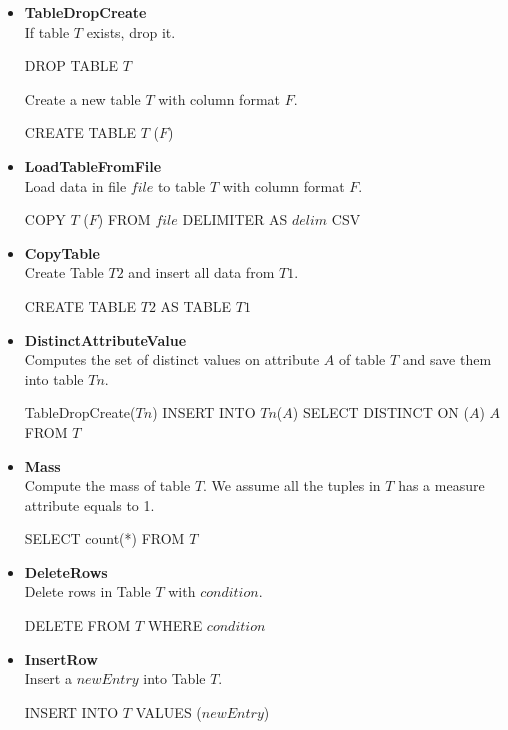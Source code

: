 \begin{itemize}
    \item \textbf{TableDropCreate} \\
    If table $T$ exists, drop it.
    \begin{algorithmic}
    \STATE DROP TABLE $T$
    \end{algorithmic} 
    Create a new table $T$ with column format $F$.
    \begin{algorithmic}
    \STATE CREATE TABLE $T$ ($F$)
    \end{algorithmic} 
    \item \textbf{LoadTableFromFile} \\
    Load data in file $file$ to table $T$ with column format $F$. 
    \begin{algorithmic}
    \STATE COPY $T$ ($F$) FROM $file$ DELIMITER AS $delim$ CSV
    \end{algorithmic}
    \item \textbf{CopyTable} \\ 
    Create Table $T2$ and insert all data from $T1$.
    \begin{algorithmic}
    \STATE CREATE TABLE $T2$ AS TABLE $T1$
    \end{algorithmic}
    \item \textbf{DistinctAttributeValue} \\
    Computes the set of distinct values on attribute $A$ of table $T$ and save them into table $Tn$.
    \begin{algorithmic}
    \STATE TableDropCreate($Tn$)
    \STATE INSERT INTO $Tn$($A$) SELECT DISTINCT ON ($A$) $A$ FROM $T$
    \end{algorithmic}
    \item \textbf{Mass} \\
    Compute the mass of table $T$. We assume all the tuples in $T$ has a measure attribute equals to 1.
    \begin{algorithmic}
    \STATE SELECT count(*) FROM $T$
    \end{algorithmic}
    \item \textbf{DeleteRows} \\
    Delete rows in Table $T$ with $condition$.
    \begin{algorithmic}
    \STATE DELETE FROM $T$ WHERE $condition$
    \end{algorithmic}
    \item \textbf{InsertRow} \\
    Insert a $newEntry$ into Table $T$.
    \begin{algorithmic}
    \STATE INSERT INTO $T$ VALUES ($newEntry$)
    \end{algorithmic}
\end{itemize}


